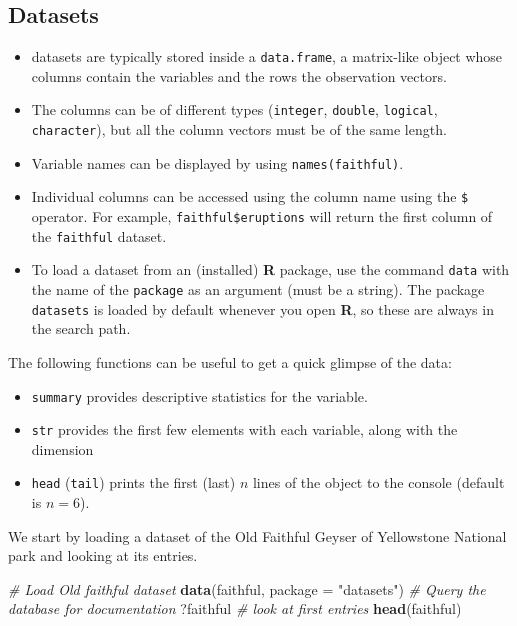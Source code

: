 \documentclass[
  11pt,
  letterpaper,
]{book}
\newenvironment{Shaded}{\begin{snugshade}}{\end{snugshade}}
\newcommand{\CommentTok}[1]{\textcolor[rgb]{0.56,0.35,0.01}{\textit{#1}}}
\newcommand{\DataTypeTok}[1]{\textcolor[rgb]{0.13,0.29,0.53}{#1}}
\newcommand{\KeywordTok}[1]{\textcolor[rgb]{0.13,0.29,0.53}{\textbf{#1}}}
\newcommand{\NormalTok}[1]{#1}
\newcommand{\StringTok}[1]{\textcolor[rgb]{0.31,0.60,0.02}{#1}}
\providecommand{\tightlist}{%
  \setlength{\itemsep}{0pt}\setlength{\parskip}{0pt}}
\theoremstyle{definition}
\theoremstyle{definition}
\theoremstyle{definition}
\theoremstyle{remark}
\begin{document}
\hypertarget{datasets}{%
\subsection{Datasets}\label{datasets}}

\begin{itemize}
\tightlist
\item
  datasets are typically stored inside a \texttt{data.frame}, a matrix-like object whose columns contain the variables and the rows the observation vectors.
\item
  The columns can be of different types (\texttt{integer}, \texttt{double}, \texttt{logical}, \texttt{character}), but all the column vectors must be of the same length.
\item
  Variable names can be displayed by using \texttt{names(faithful)}.
\item
  Individual columns can be accessed using the column name using the \texttt{\$} operator. For example, \texttt{faithful\$eruptions} will return the first column of the \texttt{faithful} dataset.
\item
  To load a dataset from an (installed) \textbf{R} package, use the command \texttt{data} with the name of the \texttt{package} as an argument (must be a string). The package \texttt{datasets} is loaded by default whenever you open \textbf{R}, so these are always in the search path.
\end{itemize}

The following functions can be useful to get a quick glimpse of the data:

\begin{itemize}
\tightlist
\item
  \texttt{summary} provides descriptive statistics for the variable.
\item
  \texttt{str} provides the first few elements with each variable, along with the dimension
\item
  \texttt{head} (\texttt{tail}) prints the first (last) \(n\) lines of the object to the console (default is \(n=6\)).
\end{itemize}

We start by loading a dataset of the Old Faithful Geyser of Yellowstone National park and looking at its entries.

\begin{Shaded}
\begin{Highlighting}[]
\CommentTok{\# Load Old faithful dataset}
\KeywordTok{data}\NormalTok{(faithful, }\DataTypeTok{package =} \StringTok{"datasets"}\NormalTok{)}
\CommentTok{\# Query the database for documentation}
\NormalTok{?faithful}
\CommentTok{\# look at first entries}
\KeywordTok{head}\NormalTok{(faithful)}
\end{Highlighting}
\end{Shaded}
\end{document}
